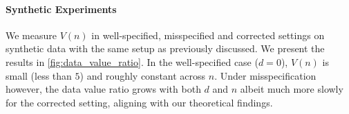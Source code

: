 \paragraph{Synthetic Experiments} We measure $V(n)$ in well-specified, misspecified and corrected settings on synthetic data with the same setup as previously discussed. 
We present the results in \autoref{fig:data_value_ratio}. In the well-specified case ($d = 0$), $V(n)$ is small (less than $5$) and roughly constant across $n$. Under misspecification however, the data value ratio grows with both $d$ and $n$ albeit much more slowly for the corrected setting, aligning with our theoretical findings. 


